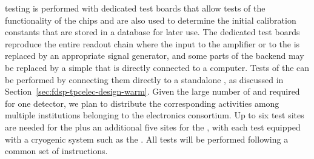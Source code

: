  testing is performed with dedicated test boards that
allow tests of the functionality of the chips and are also used
to determine the initial calibration constants that are stored in
a database for later use. The dedicated test boards reproduce the
entire readout chain where the input to the  amplifier
or to the  is replaced by an appropriate signal generator,
and some parts of the backend may be replaced by a simple 
that is directly connected to a computer. Tests of the 
can be performed by connecting them directly to a standalone ,
as discussed in Section~\ref{sec:fdsp-tpcelec-design-warm}. Given
the large number of  and  required for
one    detector, we plan to distribute the 
corresponding  activities among multiple institutions
belonging to the  electronics consortium. Up to six
test sites are needed for the  plus an additional
five sites for the , with each test 
equipped with a cryogenic system such as the . All tests
will be performed following a common set of instructions.

